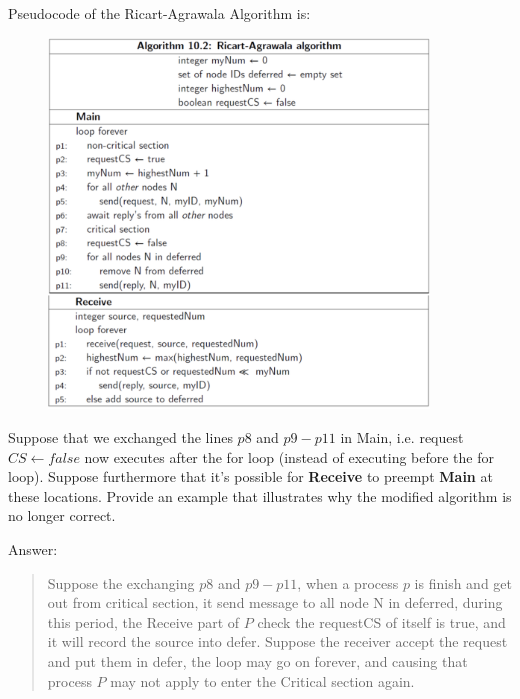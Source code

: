 \documentclass{article}
\begin{document}
\clearpage
\setcounter{question}{1}

\begin{Question} 
    Pseudocode of the Ricart-Agrawala Algorithm is:
\begin{figure}[H]
    \centering 
    \includegraphics[width=0.9\textwidth]{DV_demand1}
\end{figure}

\begin{Subquestion}
    Suppose that we exchanged the lines $p8$ and $p9-p11$ in Main, i.e. request $CS \leftarrow false$ now executes after the for loop (instead of executing before the for loop). Suppose furthermore that it's possible for \textbf{Receive} to preempt \textbf{Main} at these locations. Provide an example that illustrates why the modified algorithm is no longer correct.
    
\begin{answer}
    Answer:
    \begin{quote}
        Suppose the exchanging $p8$ and $p9-p11$, when a process $p$ is finish and get out from critical section, it send message to all node N in deferred, during this period, the Receive part of $P$ check the requestCS of itself is true, and it will record the source into defer. Suppose the receiver accept the request and put them in defer, the loop may go on forever, and causing that process $P$ may not apply to enter the Critical section again.\\
    \end{quote}
\end{answer}
\end{Subquestion}


\end{Question}
\end{document}

